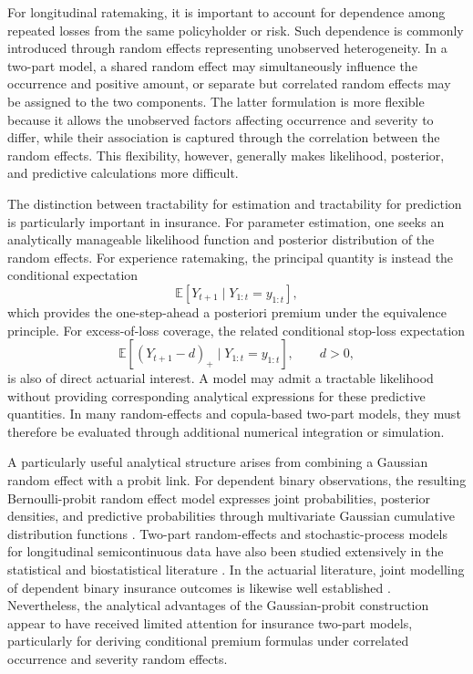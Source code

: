 \documentclass[11pt,authoryear]{elsarticle}
\def\E#1{{\mathbb E}\left[#1\right]}
\theoremstyle{nopunct}
\numberwithin{equation}{section}
\begin{document}
For longitudinal ratemaking, it is important to account for dependence
among repeated losses from the same policyholder or risk. Such
dependence is commonly introduced through random effects representing
unobserved heterogeneity. In a two-part model, a shared random effect may
simultaneously influence the occurrence and positive amount, or separate
but correlated random effects may be assigned to the two components.
The latter formulation is more flexible because it allows the
unobserved factors affecting occurrence and severity to differ, while
their association is captured through the correlation between the
random effects. This flexibility, however, generally makes likelihood,
posterior, and predictive calculations more difficult.

The distinction between tractability for estimation and tractability
for prediction is particularly important in insurance. For parameter
estimation, one seeks an analytically manageable likelihood function and
posterior distribution of the random effects. For experience ratemaking,
the principal quantity is instead the conditional expectation
\[
\E{Y_{t+1}\mid Y_{1:t}=y_{1:t}},
\]
which provides the one-step-ahead a posteriori premium under the
equivalence principle. For excess-of-loss coverage, the related
conditional stop-loss expectation
\[
\E{(Y_{t+1}-d)_+\mid Y_{1:t}=y_{1:t}},
\qquad d>0,
\]
is also of direct actuarial interest. A model may admit a tractable
likelihood without providing corresponding analytical expressions for
these predictive quantities. In many random-effects and copula-based
two-part models, they must therefore be evaluated through additional
numerical integration or simulation.

A particularly useful analytical structure arises from combining a
Gaussian random effect with a probit link. For dependent binary
observations, the resulting Bernoulli-probit random effect model
expresses joint probabilities, posterior densities, and predictive
probabilities through multivariate Gaussian cumulative distribution
functions
\citep{durante2019conjugate,fasano2021closed,cao2022scalable}.
Two-part random-effects and stochastic-process models for longitudinal
semicontinuous data have also been studied extensively in the
statistical and biostatistical literature
\citep{farewell2017two,yiu2018two}. In the actuarial literature, joint
modelling of dependent binary insurance outcomes is likewise well
established
\citep{young2009multivariate,frees2010dependent,guo2025entity,
oh2026matrix}. Nevertheless, the analytical advantages of the
Gaussian-probit construction appear to have received limited attention
for insurance two-part models, particularly for deriving conditional
premium formulas under correlated occurrence and severity random
effects.
\end{document}
